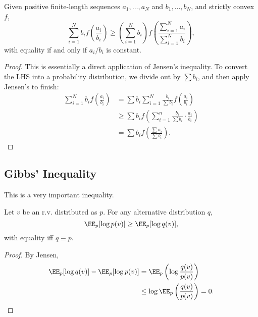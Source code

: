 \begin{theorem}
\thmlabel

Given positive finite-length sequences $a_1,\hdots, a_N$ and $b_1, \hdots, b_N$, and strictly convex $f$,
\[\sum_{i=1}^N b_if \left(\frac{a_i}{b_i}\right)\geq \left(\sum_{i=1}^N b_i\right)f \left(\frac{\sum_{i=1}^Na_i}{\sum_{i=1}^Nb_i}\right),\] 
with equality if and only if $a_i/b_i$ is constant. 
\end{theorem}

\begin{proof}
This is essentially a direct application of Jensen's inequality. To convert the LHS into a probability distribution, we divide out by $\sum b_i$, and then apply Jensen's to finish: 
\begin{align*}
	\sum_{i=1}^N b_if \left(\frac{a_i}{b_i}\right) &= \sum b_i \sum_{i=1}^N \frac{b_i}{\sum b_i} f \left(\frac{a_i}{b_i}\right) \\
																								 &\geq \sum b_i f \left(\sum_{i=1}^n \frac{b_i}{\sum b_i}\cdot \frac{a_i}{b_i}\right) \\
																								 &= \sum b_i f \left(\frac{\sum a_i}{\sum b_i}\right).
\end{align*}
\end{proof}

\subsection{Gibbs' Inequality}

This is a very important inequality. 

\begin{theorem}
\thmlabel

Let $v$ be an r.v. distributed as $p$. For any alternative distribution $q$, 
\[\EE_p[\log p(v)]\geq \EE_p[\log q(v)],\] 
with equality iff $q\equiv p$. 
\end{theorem}

\begin{proof}
By Jensen,
\begin{align*}
	\EE_p[\log q(v)] - \EE_p[\log p(v)] &= \EE_p \left(\log \frac{q(v)}{p(v)}\right) \\
																			&\leq \log \EE_p \left(\frac{q(v)}{p(v)}\right) = 0.
\end{align*}
\end{proof}
